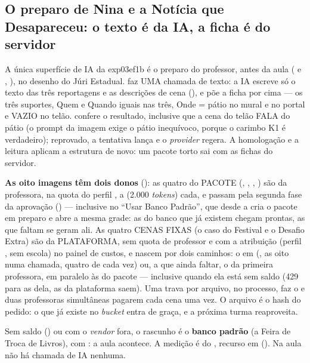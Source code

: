 \subsection{O preparo de Nina e a Notícia que Desapareceu: o texto é da IA, a ficha é do servidor}
\label{sec:ia-preparo-exp03ef1b}

A única superfície de IA da exp03ef1b é o preparo do professor, antes da aula
( e ,
), no desenho do Júri Estadual.  faz UMA chamada de texto: a IA
escreve só o texto das três reportagens e as descrições de cena
(), e  põe a ficha por cima ---
os três suportes, Quem e Quando iguais nas três, Onde = pátio no mural e no
portal e VAZIO no telão.  confere o resultado, inclusive
que a cena do telão FALA do pátio (o prompt da imagem exige o pátio
inequívoco, porque o carimbo K1 é verdadeiro); reprovado, a tentativa lança e
o \emph{provider} regera. A homologação e a leitura aplicam a estrutura de
novo: um pacote torto sai com as fichas do servidor.

\textbf{As oito imagens têm dois donos} (): as quatro
do PACOTE (, , , ) são da
professora, na quota do perfil , a
 (2.000 \emph{tokens}) cada, e passam
pela segunda fase da aprovação () --- inclusive no
\enquote{Usar Banco Padrão}, que desde a  cria o pacote em
preparo e abre a mesma grade: as do banco que já existem chegam prontas, as
que faltam se geram ali. As quatro CENAS FIXAS (o caso do Festival e o Desafio
Extra) são da PLATAFORMA, sem quota de professor e com a atribuição
 (perfil , sem escola) no painel de
custos, e nascem por dois caminhos: o  em
 (, as oito numa chamada, quatro de
cada vez) ou, a que ainda faltar, o  da primeira professora,
em paralelo às do pacote --- inclusive quando ela está sem saldo (429 para as
dela, as da plataforma saem). Uma trava por arquivo, no processo, faz o
 e duas professoras simultâneas pagarem cada cena uma vez. O arquivo
é o hash do pedido: o que já existe no \emph{bucket} entra de graça, e a
próxima turma reaproveita.

Sem saldo () ou com o \emph{vendor} fora, o rascunho
é o \textbf{banco padrão} (a Feira de Troca de Livros), com : a aula acontece. A medição é do , recurso
 em  (). Na aula não há
chamada de IA nenhuma.

